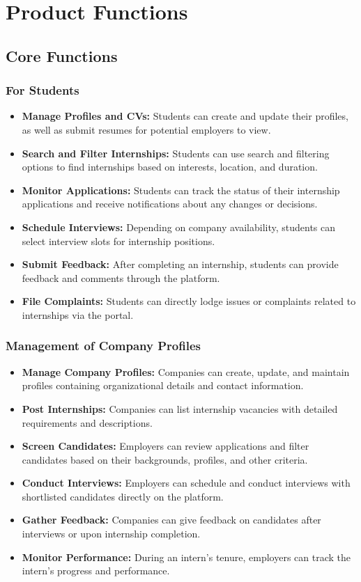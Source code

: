 \section{Product Functions}
\label{sec:product_functions}

\subsection{Core Functions}

\subsubsection{For Students}
\begin{itemize}
    \item \textbf{Manage Profiles and CVs:} Students can create and update their profiles, as well as submit resumes for potential employers to view.
    \item \textbf{Search and Filter Internships:} Students can use search and filtering options to find internships based on interests, location, and duration.
    \item \textbf{Monitor Applications:} Students can track the status of their internship applications and receive notifications about any changes or decisions.
    \item \textbf{Schedule Interviews:} Depending on company availability, students can select interview slots for internship positions.
    \item \textbf{Submit Feedback:} After completing an internship, students can provide feedback and comments through the platform.
    \item \textbf{File Complaints:} Students can directly lodge issues or complaints related to internships via the portal.
\end{itemize}

\subsubsection{Management of Company Profiles}
\begin{itemize}
    \item \textbf{Manage Company Profiles:} Companies can create, update, and maintain profiles containing organizational details and contact information.
    \item \textbf{Post Internships:} Companies can list internship vacancies with detailed requirements and descriptions.
    \item \textbf{Screen Candidates:} Employers can review applications and filter candidates based on their backgrounds, profiles, and other criteria.
    \item \textbf{Conduct Interviews:} Employers can schedule and conduct interviews with shortlisted candidates directly on the platform.
    \item \textbf{Gather Feedback:} Companies can give feedback on candidates after interviews or upon internship completion.
    \item \textbf{Monitor Performance:} During an intern’s tenure, employers can track the intern’s progress and performance.
\end{itemize}

